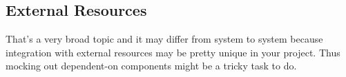 \subsection{External Resources}
That's a very broad topic and it may differ from system to system because integration with external resources may be pretty unique in your project. Thus mocking out dependent-on components might be a tricky task to do. 
